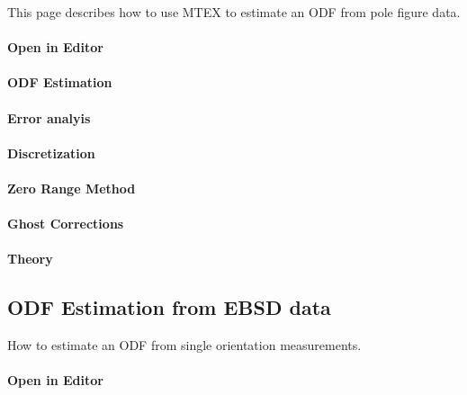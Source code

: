 \documentclass{article}
\begin{document}
		
                     \begin{par}
This page describes how to use MTEX to estimate an ODF from pole figure data.
\end{par} \vspace{1em}

                  
			\paragraph{Open in Editor}
		
			\paragraph{ODF Estimation}
		
			\paragraph{Error analyis}
		
			\paragraph{Discretization}
		
			\paragraph{Zero Range Method}
		
			\paragraph{Ghost Corrections}
		
			\paragraph{Theory}
		
		\subsection{ODF Estimation from EBSD data}

		
                     \begin{par}
How to estimate an ODF from single orientation measurements.
\end{par} \vspace{1em}

                  
			\paragraph{Open in Editor}
		
\end{document}
